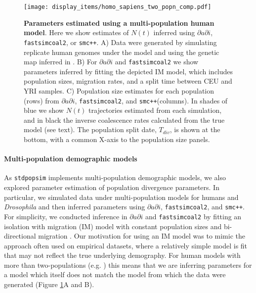 \documentclass[12pt,halfline,a4paper]{ouparticle}
\newcommand{\dadi}{$\partial a \partial i$\xspace}
\newcommand{\smcpp}{\texttt{smc++}\xspace}
\newcommand{\fastsimcoal}{\texttt{fastsimcoal2}\xspace}
\begin{document}
\begin{figure}
\begin{center}
\texttt{[image: display\_items/homo\_sapiens\_two\_popn\_comp.pdf]}
\caption{\textbf{Parameters estimated using a multi-population human model}.
Here we show estimates of $N(t)$ inferred using \dadi, \fastsimcoal, or \smcpp.
A) Data were generated by simulating
replicate human genomes under the \cite{gutenkunst2009inferring} model and using the genetic map
inferred in \cite{international2007second}.
B) For \dadi and \fastsimcoal we show parameters inferred
by fitting the depicted IM model, which includes population sizes, migration rates, and a split
time between CEU and YRI samples.
C) Population size estimates for each population (rows)
from \dadi, \fastsimcoal, and \smcpp (columns).
In shades of blue we show $N(t)$ trajectories estimated from each simulation,
and in black the inverse coalescence rates calculated from the true model (see text).
The population split date, $T_{div}$, is shown at
the bottom, with a common X-axis to the population size panels.}
\label{fig:IM_popn_human}
\end{center}
\end{figure}

\paragraph*{Multi-population demographic models}
As \texttt{stdpopsim} implements multi-population demographic models, we also
explored parameter estimation of population divergence parameters. In particular,
we simulated data under multi-population models for humans and \emph{Drosophila}
and then inferred  parameters using \dadi, \fastsimcoal, and \smcpp.
For simplicity, we conducted inference in \dadi and \fastsimcoal by fitting an isolation with migration (IM) model
with constant population sizes and bi-directional migration \citep{hey2004im}. Our motivation for using
an IM model was to mimic the approach often used on empirical datasets, where a relatively
simple model is fit that may not reflect the true underlying demography.
For human models with more than two-populations (e.g. \cite{gutenkunst2009inferring})
this means that we are inferring parameters for a model which itself does
not match the model from which the data were generated (Figure
\ref{fig:IM_popn_human}A and B).
\end{document}
